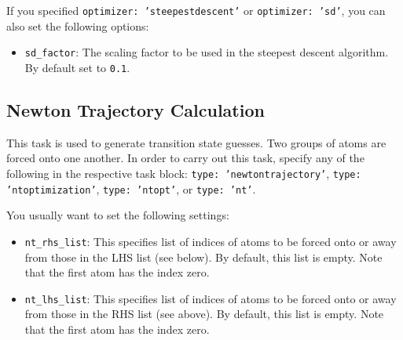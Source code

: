 \documentclass[]{tufte-book}
\begin{document}
If you specified \texttt{optimizer: 'steepestdescent'} or \texttt{optimizer: 'sd'}, you can also set the following options:
\begin{itemize}
\item \texttt{sd\_factor}: The scaling factor to be used in the steepest descent algorithm. By default set to \texttt{0.1}.
\end{itemize}

\subsection{Newton Trajectory Calculation}

This task is used to generate transition state guesses. Two groups of atoms are forced onto one another.
In order to carry out this task, specify any of the following in the respective task block:
\texttt{type: 'newtontrajectory'}, \texttt{type: 'ntoptimization'}, \texttt{type: 'ntopt'}, or \texttt{type: 'nt'}.

You usually want to set the following settings:
\begin{itemize}
\item \texttt{nt\_rhs\_list}: This specifies list of indices of atoms to be forced onto or away from those
in the LHS list (see below). By default, this list is empty. Note that the first atom has the index zero.
\item \texttt{nt\_lhs\_list}: This specifies list of indices of atoms to be forced onto or away from those
in the RHS list (see above). By default, this list is empty. Note that the first atom has the index zero.
\end{itemize}
\end{document}
